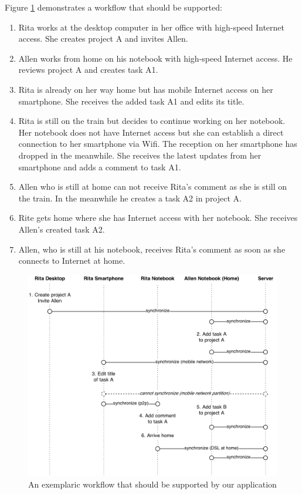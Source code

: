 Figure \ref{fig:scenario.workflow} demonstrates a workflow that should be supported:\\

\begin{enumerate}
\item Rita works at the desktop computer in her office with high-speed Internet access. She creates project A and invites Allen.
\item Allen works from home on his notebook with high-speed Internet access. He reviews project A and creates task A1.
\item Rita is already on her way home but has mobile Internet access on her smartphone. She receives the added task A1 and edits its title.
\item Rita is still on the train but decides to continue working on her notebook. Her notebook does not have Internet access but she can establish a direct connection to her smartphone via Wifi. The reception on her smartphone has dropped in the meanwhile. She receives the latest updates from her smartphone and adds a comment to task A1.
\item Allen who is still at home can not receive Rita's comment as she is still on the train. In the meanwhile he creates a task A2 in project A.
\item Rite gets home where she has Internet access with her notebook. She receives Allen's created task A2.
\item Allen, who is still at his notebook, receives Rita's comment as soon as she connects to Internet at home.
\end{enumerate}

\begin{figure}[!ht]
\centering
\includegraphics[width=1.0\textwidth]{img/workflow}
\caption{An exemplaric workflow that should be supported by our application}
\label{fig:scenario.workflow}
\end{figure}

